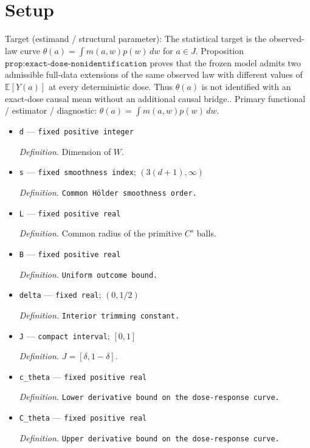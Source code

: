 \documentclass{article}
\begin{document}
\section{Setup}

Target (estimand / structural parameter): The statistical target is the observed-law curve \(\theta(a)=\int m(a,w)p(w)\,dw\) for \(a\in J\). Proposition \(\texttt{prop:exact-dose-nonidentification}\) proves that the frozen model admits two admissible full-data extensions of the same observed law with different values of \(\mathbb E[Y(a)]\) at every deterministic dose. Thus \(\theta(a)\) is not identified with an exact-dose causal mean without an additional causal bridge..
Primary functional / estimator / diagnostic: \(\theta(a)=\int m(a,w)p(w)\,dw\).
\begin{itemize}
  \item \texttt{d} --- \texttt{fixed positive integer}
  \par\smallskip\noindent\emph{Definition.} Dimension of \(W\).
  \item \texttt{s} --- \texttt{fixed smoothness index}; \((3(d+1),\infty)\)
  \par\smallskip\noindent\emph{Definition.} \texttt{Common Hölder smoothness order.}
  \item \texttt{L} --- \texttt{fixed positive real}
  \par\smallskip\noindent\emph{Definition.} Common radius of the primitive \(C^{s}\) balls.
  \item \texttt{B} --- \texttt{fixed positive real}
  \par\smallskip\noindent\emph{Definition.} \texttt{Uniform outcome bound.}
  \item \texttt{delta} --- \texttt{fixed real}; \((0,1/2)\)
  \par\smallskip\noindent\emph{Definition.} \texttt{Interior trimming constant.}
  \item \texttt{J} --- \texttt{compact interval}; \([0,1]\)
  \par\smallskip\noindent\emph{Definition.} \(J=[\delta,1-\delta]\).
  \item \texttt{c\_\allowbreak{}theta} --- \texttt{fixed positive real}
  \par\smallskip\noindent\emph{Definition.} \texttt{Lower derivative bound on the dose-\allowbreak{}response curve.}
  \item \texttt{C\_\allowbreak{}theta} --- \texttt{fixed positive real}
  \par\smallskip\noindent\emph{Definition.} \texttt{Upper derivative bound on the dose-\allowbreak{}response curve.}

\end{itemize}
\end{document}
